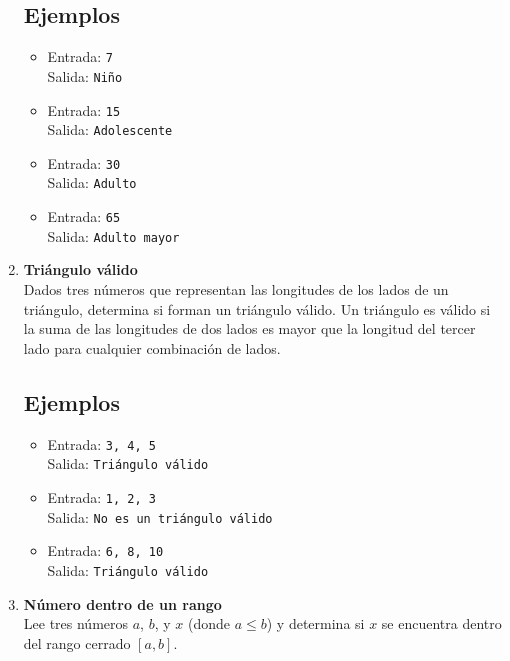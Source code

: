 \begin{enumerate}
    \subsection*{Ejemplos}
    \begin{itemize}
        \item Entrada: \texttt{7}\\
              Salida: \texttt{Niño}
        \item Entrada: \texttt{15}\\
              Salida: \texttt{Adolescente}
        \item Entrada: \texttt{30}\\
              Salida: \texttt{Adulto}
        \item Entrada: \texttt{65}\\
              Salida: \texttt{Adulto mayor}
    \end{itemize}

    \item \textbf{Triángulo válido}\\
    Dados tres números que representan las longitudes de los lados de un triángulo, determina si forman un triángulo válido. Un triángulo es válido si la suma de las longitudes de dos lados es mayor que la longitud del tercer lado para cualquier combinación de lados.
    \subsection*{Ejemplos}
    \begin{itemize}
        \item Entrada: \texttt{3, 4, 5}\\
              Salida: \texttt{Triángulo válido}
        \item Entrada: \texttt{1, 2, 3}\\
              Salida: \texttt{No es un triángulo válido}
        \item Entrada: \texttt{6, 8, 10}\\
              Salida: \texttt{Triángulo válido}
    \end{itemize}

    \item \textbf{Número dentro de un rango}\\
    Lee tres números \(a\), \(b\), y \(x\) (donde \(a \leq b\)) y determina si \(x\) se encuentra dentro del rango cerrado \([a, b]\).

\end{enumerate}

